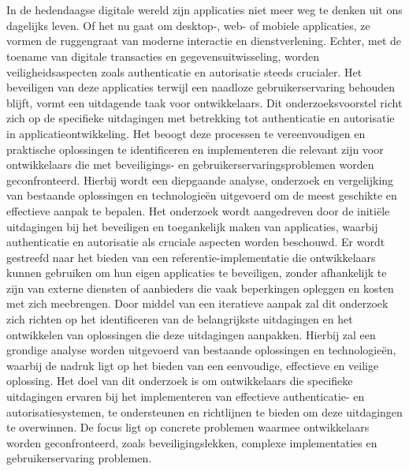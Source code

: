 
\chapter{}%
\label{ch:inleiding}

In de hedendaagse digitale wereld zijn applicaties niet meer weg te denken uit ons dagelijks leven. Of het nu gaat om desktop-, web- of mobiele applicaties, ze vormen de ruggengraat van moderne interactie 
en dienstverlening. Echter, met de toename van digitale transacties en gegevensuitwisseling, worden veiligheidsaspecten zoals authenticatie en autorisatie steeds crucialer. Het beveiligen van deze applicaties 
terwijl een naadloze gebruikerservaring behouden blijft, vormt een uitdagende taak voor ontwikkelaars.
\newline
\newline
Dit onderzoeksvoorstel richt zich op de specifieke uitdagingen met betrekking tot authenticatie en autorisatie in applicatieontwikkeling. Het beoogt deze processen te vereenvoudigen en praktische oplossingen 
te identificeren en implementeren die relevant zijn voor ontwikkelaars die met beveiligings- en gebruikerservaringsproblemen worden geconfronteerd. Hierbij wordt een diepgaande analyse, onderzoek en 
vergelijking van bestaande oplossingen en technologieën uitgevoerd om de meest geschikte en effectieve aanpak te bepalen.
\newline
\newline
Het onderzoek wordt aangedreven door de initiële uitdagingen bij het beveiligen en toegankelijk maken van applicaties, waarbij authenticatie en autorisatie als cruciale aspecten worden beschouwd. 
Er wordt gestreefd naar het bieden van een referentie-implementatie die ontwikkelaars kunnen gebruiken om hun eigen applicaties te beveiligen, zonder afhankelijk te zijn van externe diensten of aanbieders die vaak beperkingen opleggen en kosten met zich meebrengen.
\newline
\newline
Door middel van een iteratieve aanpak zal dit onderzoek zich richten op het identificeren van de belangrijkste uitdagingen en het ontwikkelen van oplossingen die deze uitdagingen aanpakken. 
Hierbij zal een grondige analyse worden uitgevoerd van bestaande oplossingen en technologieën, waarbij de nadruk ligt op het bieden van een eenvoudige, effectieve en veilige oplossing.
\newline
\newline
Het doel van dit onderzoek is om ontwikkelaars die specifieke uitdagingen ervaren bij het implementeren van effectieve authenticatie- en autorisatiesystemen, te ondersteunen en richtlijnen te bieden om deze uitdagingen te overwinnen.
De focus ligt op concrete problemen waarmee ontwikkelaars worden geconfronteerd, zoals beveiligingslekken, complexe implementaties en gebruikerservaring problemen.


